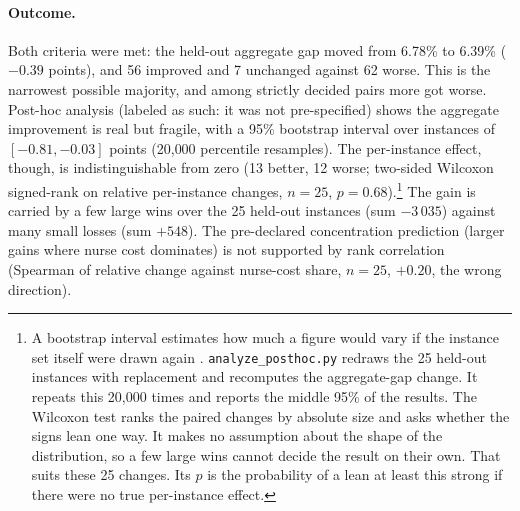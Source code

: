 \documentclass[11pt]{article}
\newcommand{\anote}[1]{\footnote{#1}}
\begin{document}
	\paragraph{Outcome.} Both criteria were met: the held-out aggregate gap moved from 6.78\% to
	6.39\% ($-0.39$ points), and 56 improved and 7 unchanged against 62 worse. This is the narrowest
	possible majority, and among strictly decided pairs more got worse. Post-hoc analysis (labeled
	as such: it was not pre-specified) shows the aggregate improvement is real but fragile, with a
	95\% bootstrap interval over instances of $[-0.81, -0.03]$ points (20{,}000 percentile
	resamples). The per-instance effect, though, is indistinguishable from zero (13 better, 12
	worse; two-sided Wilcoxon signed-rank on relative per-instance changes, $n{=}25$, $p=0.68$).\anote{A bootstrap interval estimates how much a figure would vary if the instance set itself were drawn again \citep{efron1994}. \texttt{analyze\_posthoc.py} redraws the 25 held-out instances with replacement and recomputes the aggregate-gap change. It repeats this 20{,}000 times and reports the middle 95\% of the results. The Wilcoxon test \citep{wilcoxon1945} ranks the paired changes by absolute size and asks whether the signs lean one way. It makes no assumption about the shape of the distribution, so a few large wins cannot decide the result on their own. That suits these 25 changes. Its $p$ is the probability of a lean at least this strong if there were no true per-instance effect.} The
	gain is carried by a few large wins over the 25 held-out instances (sum $-3\,035$) against
	many small losses (sum $+548$). The pre-declared concentration prediction (larger gains where
	nurse cost dominates) is not supported by rank correlation \citep{spearman1904} (Spearman of relative change
	against nurse-cost share, $n{=}25$, $+0.20$, the wrong direction).
\end{document}
